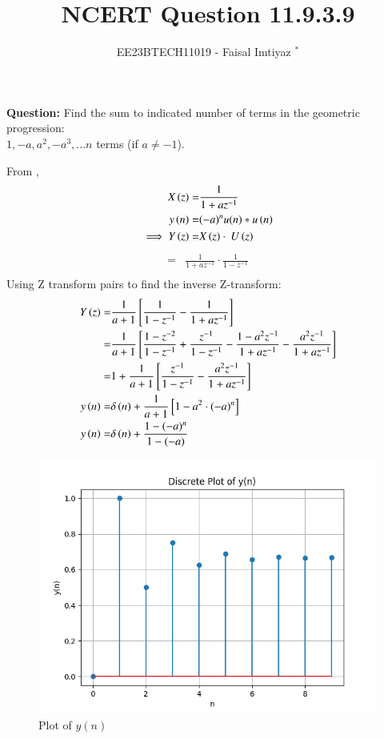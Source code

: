 \documentclass[journal,12pt,twocolumn]{IEEEtran}
\theoremstyle{remark}
\begin{document}

\vspace{3cm}
\title{NCERT Question 11.9.3.9}
\author{EE23BTECH11019 - Faisal Imtiyaz $^{*}$%
}
\maketitle
\newpage
\bigskip

\renewcommand{\thefigure}{\arabic{figure}}
\renewcommand{\thetable}{\arabic{table}}


\vspace{3cm}
\textbf{Question:} Find the sum to indicated number of terms in the geometric progression:\\
$1,-a, a^2, -a^3,...n$ terms (if $a\neq-1$).\\
\solution

\newline
From ,
\begin{align}
X\left(z\right) =& \frac{1}{1+az^{-1}}\\
y\left(n\right)= &{(-a)^n}u(n)*u\left(n\right)\\
\implies Y\left(z\right)= &X\left(z\right)\cdot\ U\left(z\right)
\end{align}
\begin{align}
    = &\frac{1}{1+az^{-1}}\cdot\frac{1}{1-z^{-1}}\\
\end{align}
Using Z transform pairs  to find the inverse Z-transform:\\
\begin{align}
    Y\left(z\right)=& \frac{1}{a+1}{}\left[\frac{1}{1-z^{-1}} - \frac{1}{1+az^{-1}}\right]\\
    =& \frac{1}{a+1}{}\left[\frac{1-z^{-2}}{1-z^{-1}}+\frac{z^{-1}}{1-z^{-1}} -\frac{{1}-a^{2}z^{-1}}{1+az^{-1}} -\frac{a^{2}z^{-1}}{1+az^{-1}}\right]\\
    =& 1+\frac{1}{a+1}{}\left[\frac{z^{-1}}{1-z^{-1}}-\frac{a^{2}z^{-1}}{1+az^{-1}}\right]\\
    y\left(n\right) =& \delta\left(n\right) + \frac{1}{a+1}{}\left[1- a^{2}\cdot(-a)^{n}\right]\\
    y\left(n\right) =& \delta\left(n\right)+ \frac{1-(-a)^{n}}{1-(-a)}
\end{align}
\begin{figure}[ht!]
	\includegraphics[width=\columnwidth]{plots/plot-file.png}
	\caption{Plot of $y(n)$}
	\label{fig:1.2}
\end{figure}
\end{document}
